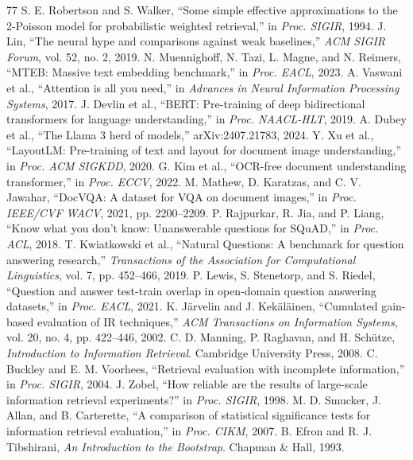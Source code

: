 \documentclass[conference]{IEEEtran}
\begin{document}
\begin{thebibliography}{77}
 S. E. Robertson and S. Walker, ``Some simple effective approximations to the 2-Poisson model for probabilistic weighted retrieval,'' in \emph{Proc. SIGIR}, 1994.
 J. Lin, ``The neural hype and comparisons against weak baselines,'' \emph{ACM SIGIR Forum}, vol. 52, no. 2, 2019.
 N. Muennighoff, N. Tazi, L. Magne, and N. Reimers, ``MTEB: Massive text embedding benchmark,'' in \emph{Proc. EACL}, 2023.
 A. Vaswani et al., ``Attention is all you need,'' in \emph{Advances in Neural Information Processing Systems}, 2017.
 J. Devlin et al., ``BERT: Pre-training of deep bidirectional transformers for language understanding,'' in \emph{Proc. NAACL-HLT}, 2019.
 A. Dubey et al., ``The Llama 3 herd of models,'' arXiv:2407.21783, 2024.
 Y. Xu et al., ``LayoutLM: Pre-training of text and layout for document image understanding,'' in \emph{Proc. ACM SIGKDD}, 2020.
 G. Kim et al., ``OCR-free document understanding transformer,'' in \emph{Proc. ECCV}, 2022.
 M. Mathew, D. Karatzas, and C. V. Jawahar, ``DocVQA: A dataset for VQA on document images,'' in \emph{Proc. IEEE/CVF WACV}, 2021, pp. 2200--2209.
 P. Rajpurkar, R. Jia, and P. Liang, ``Know what you don't know: Unanswerable questions for SQuAD,'' in \emph{Proc. ACL}, 2018.
 T. Kwiatkowski et al., ``Natural Questions: A benchmark for question answering research,'' \emph{Transactions of the Association for Computational Linguistics}, vol. 7, pp. 452--466, 2019.
 P. Lewis, S. Stenetorp, and S. Riedel, ``Question and answer test-train overlap in open-domain question answering datasets,'' in \emph{Proc. EACL}, 2021.
 K. J\"arvelin and J. Kek\"al\"ainen, ``Cumulated gain-based evaluation of IR techniques,'' \emph{ACM Transactions on Information Systems}, vol. 20, no. 4, pp. 422--446, 2002.
 C. D. Manning, P. Raghavan, and H. Sch\"utze, \emph{Introduction to Information Retrieval}. Cambridge University Press, 2008.
 C. Buckley and E. M. Voorhees, ``Retrieval evaluation with incomplete information,'' in \emph{Proc. SIGIR}, 2004.
 J. Zobel, ``How reliable are the results of large-scale information retrieval experiments?'' in \emph{Proc. SIGIR}, 1998.
 M. D. Smucker, J. Allan, and B. Carterette, ``A comparison of statistical significance tests for information retrieval evaluation,'' in \emph{Proc. CIKM}, 2007.
 B. Efron and R. J. Tibshirani, \emph{An Introduction to the Bootstrap}. Chapman \& Hall, 1993.

\end{thebibliography}
\end{document}
